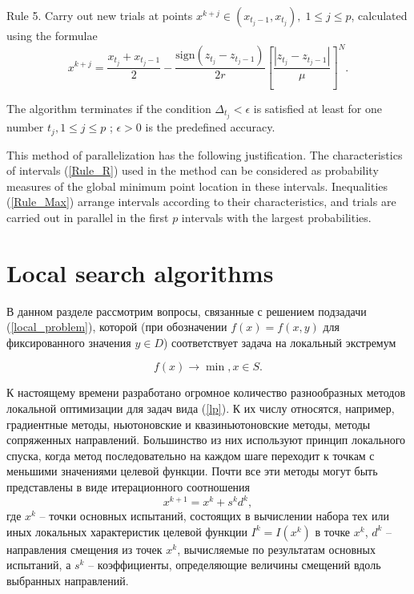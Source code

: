 \documentclass{svproc}
\begin{document}
Rule 5. Carry out new trials at points $x^{k+j}\in(x_{t_j-1},x_{t_j}), \; 1\leq j\leq p$, calculated using the formulae
\begin{equation}\label{Rule_X}
x^{k+j} = \frac{x_{t_j}+x_{t_j-1}}{2} - \frac{\mathrm{sign}(z_{t_j}-z_{t_j-1})}{2r}\left[\frac{\left|z_{t_j}-z_{t_j-1}\right|}{\mu}\right]^N.
\end{equation}

The algorithm terminates if the condition $\Delta_{t_j}<\epsilon$ is satisfied at least for one number $t_j, 1 \leq j \leq p$ ; $\epsilon>0$ is the predefined accuracy.

This method of parallelization has the following justification. The characteristics of intervals (\ref{Rule_R}) used in the method can be considered as probability measures of the global minimum point location in these intervals. Inequalities (\ref{Rule_Max}) arrange intervals according to their characteristics, and trials are carried out in parallel in the first $p$ intervals with the largest probabilities.




\section{Local search algorithms}


В данном разделе рассмотрим вопросы, связанные с решением подзадачи (\ref{local_problem}), которой (при обозначении $f(x) = f(x,y)$ для фиксированного значения $y\in D$) соответствует задача на локальный экстремум

\begin{equation} \label{lp}
f(x) \rightarrow \min, x\in S. 
\end{equation}

К настоящему времени разработано огромное количество разнообразных методов локальной оптимизации для задач вида (\ref{lp}). К их числу относятся, например, градиентные методы, ньютоновские и квазиньютоновские методы, методы сопряженных направлений. Большинство из них используют принцип локального спуска, когда метод последовательно на каждом шаге переходит к точкам с меньшими значениями целевой функции. Почти все эти методы могут быть представлены в виде итерационного соотношения
\[
x^{k+1} = x^k + s^k d^k,
\]
где $x^k$ -- точки основных испытаний, состоящих в вычислении набора тех или иных локальных характеристик целевой функции $I^k=I(x^k)$ в точке $x^k$, $d^k$ -- направления смещения из точек $x^k$, вычисляемые по результатам основных испытаний, а $s^k$ -- коэффициенты, определяющие величины смещений вдоль выбранных направлений.
\end{document}
